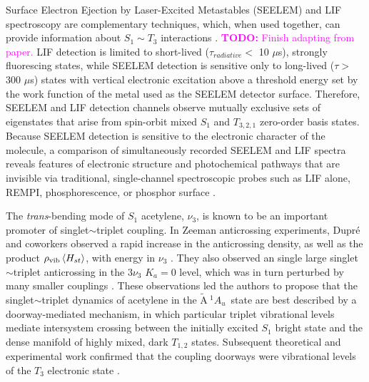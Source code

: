 \documentclass[12pt]{mitthesis}
\newcommand{\TODO} [1]{\textcolor{magenta}{\textbf{TODO:} #1}}
\newcommand{\rcm}{cm$^{-1}$}
\newcommand{\astate}{$
  \tilde{\text{A}} \: ^1\!A_u
  $}
\newcommand{\StoS}{$
  S_1 \leftarrow S_0
  $}
\newcommand{\microsec}{$\mu$s}
\begin{document}
Surface Electron Ejection by Laser-Excited Metastables \cite{sneh89,
  sneh91, humphrey97} (SEELEM) and LIF spectroscopy are complementary
techniques, which, when used together, can provide information about
$S_1 \sim T_3$ interactions \cite{humphrey97, mishra04, altunata00,
  altunata02}.  \TODO{Finish adapting from paper.}  LIF detection is
limited to short-lived ($\tau_{radiative}<$ 10 \microsec), strongly
fluorescing states, while SEELEM detection is sensitive only to
long-lived ($\tau >$ 300 \microsec) states with vertical electronic
excitation above a threshold energy set by the work function of the
metal used as the SEELEM detector surface. Therefore, SEELEM and LIF
detection channels observe mutually exclusive sets of eigenstates that
arise from spin-orbit mixed $S_1$ and $T_{3,2,1}$ zero-order basis
states.  Because SEELEM detection is sensitive to the electronic
character of the molecule, a comparison of simultaneously recorded
SEELEM and LIF spectra reveals features of electronic structure and
photochemical pathways that are invisible via traditional,
single-channel spectroscopic probes such as LIF alone, REMPI,
phosphorescence, or phosphor surface \cite{shi98, campos01, burton72}.


The \emph{trans}-bending mode of $S_1$ acetylene, $\nu_3$, is known to
be an important promoter of singlet$\sim$triplet coupling.  In Zeeman
anticrossing experiments, Dupr\'{e} and coworkers observed a rapid
increase in the anticrossing density, as well as the product
$\rho_{\text{vib}} \mathinner{\langle{H_{st}}\rangle}$, with energy in $\nu_3$
\cite{dupre91, dupre95b}.  They also observed an single large
singlet$\sim$triplet anticrossing in the $3 \nu_3$ $K_a=0$ level,
which was in turn perturbed by many smaller couplings \cite{dupre93}.
These observations led the authors to propose that the
singlet$\sim$triplet dynamics of acetylene in the \astate\ state are
best described by a doorway-mediated mechanism, in which particular
triplet vibrational levels mediate intersystem crossing between the
initially excited $S_1$ bright state and the dense manifold of highly
mixed, dark $T_{1,2}$ states.  Subsequent theoretical and experimental
work confirmed that the coupling doorways were vibrational levels of
the $T_3$ electronic state \cite{vacek96, sherrill96, humphrey97,
  altunata00}.
\end{document}
